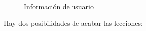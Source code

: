 \begin{itemize}
\begin{figure}[H]
\begin{center}
\caption{Información de usuario\label{fig:usuario}}
\end{center}
\end{figure}

\end{itemize}

Hay dos posibilidades de acabar las lecciones:

